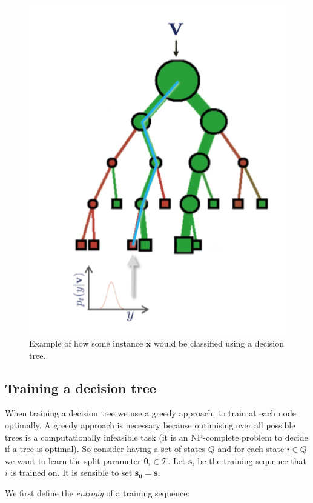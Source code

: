 \documentclass[12pt,twoside,notitlepage]{report}
\newcommand{\vc}[1]{\mathbf{#1}}
\newcommand{\cl}[1]{\mathcal{#1}}
\begin{document}
            \begin{figure}
                \centering
                \includegraphics[scale=0.5]{tree_example_classification}
                \caption{Example of how some instance $\vc{x}$ would be classified using a decision tree.}
                \label{fig:decision_tree_classify}
            \end{figure}

        \subsection{Training a decision tree}
            When training a decision tree we use a greedy approach, to train at each node optimally. A 
            greedy approach is necessary because optimising over all possible trees is a computationally infeasible task (it is an 
            NP-complete problem to decide if a tree is optimal). So consider having a set of states $Q$ and for each state
            $i \in Q$ we want to learn the split parameter $\vc{\theta}_i \in \cl{T}$. Let $\vc{s}_i$ be the training 
            sequence that $i$ is trained on. It is sensible to set $\vc{s_0}=\vc{s}$. 

            We first define the \textit{entropy} of a training sequence:
\end{document}
